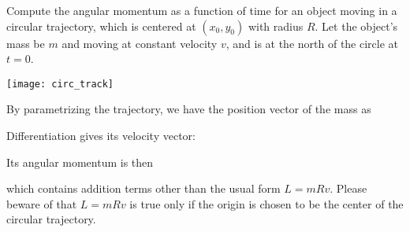 \documentclass[class=article, crop=false, 12pt]{standalone}
\begin{document}
\begin{example}
    Compute the angular momentum as a function of time for an object moving in a circular trajectory,
    which is centered at $(x_0,y_0)$ with radius $R$.
    Let the object's mass be $m$ and moving at constant velocity $v$, 
    and is at the north of the circle at $t=0$.
    
    \begin{center}
        \begin{minipage}{0.4\linewidth}
            \centering
            \texttt{[image: circ\_track]}
        \end{minipage}
    \end{center}

    By parametrizing the trajectory, we have the position vector of the mass as
    
    Differentiation gives its velocity vector:

    Its angular momentum is then

    which contains addition terms other than the usual form $L=mRv$. 
    Please beware of that $L=mRv$ is true only if the origin is chosen to be the center of the circular trajectory.
\end{example}
\end{document}
